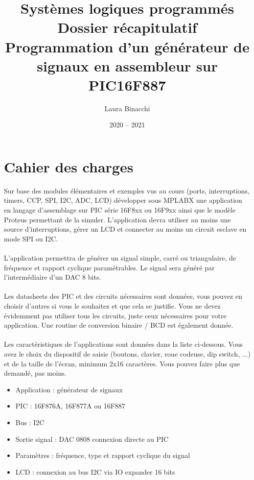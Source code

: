 \documentclass{article}
\title{Systèmes logiques programmés\bigbreak \bigbreak
    \large Dossier récapitulatif\bigbreak
    \normalsize Programmation d'un générateur de signaux en assembleur sur PIC16F887\bigbreak}
\date{2020 -- 2021}
\author{Laura Binacchi}
\begin{document}
    
    \newpage
    \tableofcontents
    \newpage

    \section{Cahier des charges}
    \paragraph{}
    Sur base des modules élémentaires et exemples vus au cours (ports, interruptions, timers, CCP, SPI, I2C, ADC, LCD) développer sous MPLABX une application en langage d’assemblage sur PIC série 16F8xx ou 16F9xx ainsi que le modèle Proteus permettant de la simuler. L’application devra utiliser au moins une source d’interruptions, gérer un LCD et connecter au moins un circuit esclave en mode SPI ou I2C.

    \paragraph{}
    L’application permettra de générer un signal simple, carré ou triangulaire, de fréquence et rapport cyclique paramétrables. Le signal sera généré par l’intermédiaire d’un DAC 8 bits.

    \paragraph{}
    Les datasheets des PIC et des circuits nécessaires sont données, vous pouvez en choisir d’autres si vous le souhaitez et que cela se justifie. Vous ne devez évidemment pas utiliser tous les circuits, juste ceux nécessaires pour votre application. Une routine de conversion binaire / BCD est également donnée.

    \paragraph{}
    Les caractéristiques de l'applications sont données dans la liste ci-dessous. Vous avez le choix du dispositif de saisie (boutons, clavier, roue codeuse, dip switch, ...) et de la taille de l’écran, minimum 2x16 caractères. Vous pouvez faire plus que demandé, pas moins.
    \begin{itemize}[label=$\bullet$]
        \item Application : générateur de signaux
        \item PIC : 16F876A, 16F877A ou 16F887
        \item Bus : I2C
        \item Sortie signal : DAC 0808 connexion directe au PIC
        \item Paramètres : fréquence, type et rapport cyclique du signal
        \item LCD : connexion au bus I2C via IO expander 16 bits
    \end{itemize}
\end{document}
